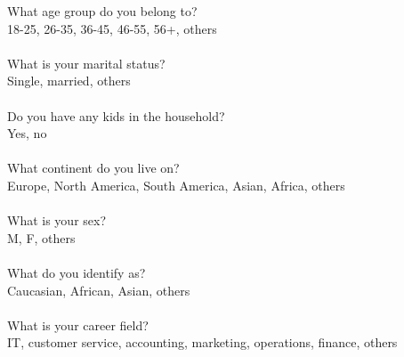 \documentclass[12pt]{article}
\begin{document}
What age group do you belong to? \\
18-25, 26-35, 36-45, 46-55, 56+, others \\ \\
What is your marital status? \\
Single, married, others \\ \\
Do you have any kids in the household? \\
Yes, no \\ \\
What continent do you live on? \\
Europe, North America, South America, Asian, Africa, others \\ \\
What is your sex? \\
M, F, others \\ \\
What do you identify as? \\
Caucasian, African, Asian, others \\ \\
What is your career field? \\
IT, customer service, accounting, marketing, operations, finance, others 
\end{document}
